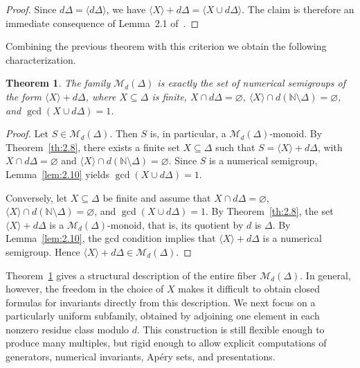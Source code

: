 \documentclass[12pt,a4paper]{amsart}
\newtheorem{theorem}{Theorem}[section]
\theoremstyle{definition}
\theoremstyle{remark}
\begin{document}
\begin{proof}
Since $d\Delta=\langle d\Delta \rangle$, we have $\langle X \rangle+d\Delta=\langle X\cup d\Delta \rangle$. The claim is therefore an immediate consequence of Lemma~2.1 of~\cite{book}.
\end{proof}

Combining the previous theorem with this criterion we obtain the following characterization.

\begin{theorem}\label{th:Md-fiber}
The family $\mathcal{M}_d(\Delta)$ is exactly the set of numerical semigroups of the form $\langle X \rangle+d\Delta$, where $X\subseteq \Delta$ is finite, $X\cap d\Delta=\varnothing$,
$\langle X \rangle\cap d(\mathbb{N}\setminus \Delta)=\varnothing$, and $\operatorname{gcd}(X\cup d\Delta)=1$.
\end{theorem}

\begin{proof}
Let $S\in \mathcal{M}_d(\Delta)$. Then $S$ is, in particular, a $\mathcal{M}_d(\Delta)$-monoid. By Theorem~\ref{th:2.8}, there exists a finite set $X\subseteq \Delta$ such that $S=\langle X \rangle+d\Delta$,
with $X\cap d\Delta=\varnothing$ and $\langle X \rangle\cap d(\mathbb{N}\setminus \Delta)=\varnothing$. Since $S$ is a numerical semigroup, Lemma~\ref{lem:2.10} yields $\operatorname{gcd}(X\cup d\Delta)=1$.

Conversely, let $X\subseteq \Delta$ be finite and assume that
$X\cap d\Delta=\varnothing$, $\langle X \rangle\cap d(\mathbb{N}\setminus \Delta)=\varnothing$, and
$\operatorname{gcd}(X\cup d\Delta)=1$. By Theorem~\ref{th:2.8}, the set $\langle X \rangle+d\Delta$ is a $\mathcal{M}_d(\Delta)$-monoid, that is, its quotient by $d$ is $\Delta$. By Lemma~\ref{lem:2.10}, the gcd condition implies that $\langle X \rangle+d\Delta$ is a numerical semigroup. Hence $\langle X \rangle+d\Delta\in \mathcal{M}_d(\Delta)$.
\end{proof}

Theorem~\ref{th:Md-fiber} gives a structural description of the entire fiber
$\mathcal{M}_d(\Delta)$. In general, however, the freedom in the choice of $X$ makes it
difficult to obtain closed formulas for invariants directly from this description. We next
focus on a particularly uniform subfamily, obtained by adjoining one element in each
nonzero residue class modulo $d$. This construction is still flexible enough to produce
many multiples, but rigid enough to allow explicit computations of generators, numerical
invariants, Ap\'ery sets, and presentations.
\end{document}
